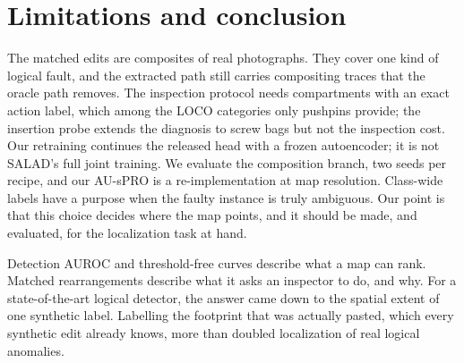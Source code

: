 \section{Limitations and conclusion}
\label{sec:conclusion}
The matched edits are composites of real photographs. They cover one kind of logical fault, and the extracted path still carries compositing traces that the oracle path removes. The inspection protocol needs compartments with an exact action label, which among the LOCO categories only pushpins provide; the insertion probe extends the diagnosis to screw bags but not the inspection cost. Our retraining continues the released head with a frozen autoencoder; it is not SALAD's full joint training. We evaluate the composition branch, two seeds per recipe, and our AU-sPRO is a re-implementation at map resolution. Class-wide labels have a purpose when the faulty instance is truly ambiguous. Our point is that this choice decides where the map points, and it should be made, and evaluated, for the localization task at hand.

Detection AUROC and threshold-free curves describe what a map can rank. Matched rearrangements describe what it asks an inspector to do, and why. For a state-of-the-art logical detector, the answer came down to the spatial extent of one synthetic label. Labelling the footprint that was actually pasted, which every synthetic edit already knows, more than doubled localization of real logical anomalies.
